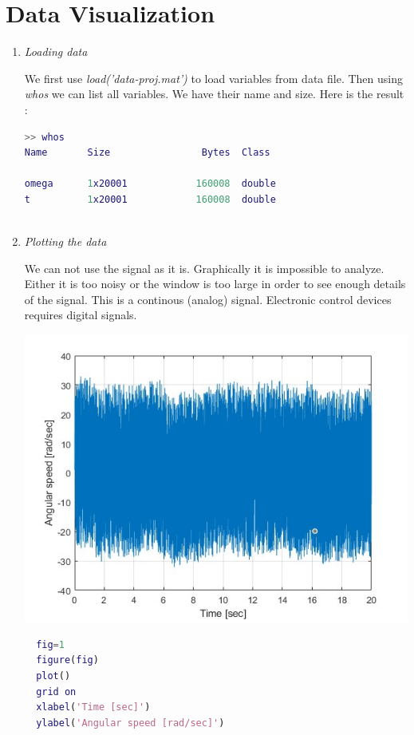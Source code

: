 \documentclass[a4paper,12pt]{article}
\begin{document}
\section{Data Visualization}
\begin{enumerate}[label={\color{blue}\arabic*)}]

\item \emph{Loading data}

We first use \textit{load('data-proj.mat')} to load variables from data file. Then using \textit{whos} we can list all variables. We have their name and size.
Here is the result : 


\begin{lstlisting}[style=Matlab-editor,language=Matlab, caption= Loaded variables, captionpos=b]
  >> whos
Name       Size                Bytes  Class     

omega      1x20001            160008  double              
t          1x20001            160008  double 
  
\end{lstlisting}


\item \emph{Plotting the data}

We can not use the signal as it is. Graphically it is impossible to analyze. Either it is too noisy or the window is too large in order to see enough details of the signal. This is a continous (analog) signal. Electronic control devices requires digital signals.
\begin{multicols}{2}
\begin{center}
  \includegraphics[scale=0.35]{Figures/q2.jpg}
  \label{F2}
\end{center}
\columnbreak

\begin{lstlisting}[style=Matlab-editor,language=Matlab, caption={Code for Figure 2}, captionpos=b, basicstyle=\small\ttfamily]
  %% Plot of angular speed
  fig=1
  figure(fig)
  plot()
  grid on 
  xlabel('Time [sec]')
  ylabel('Angular speed [rad/sec]')
  \end{lstlisting}
\end{multicols}
\end{enumerate}
\end{document}
